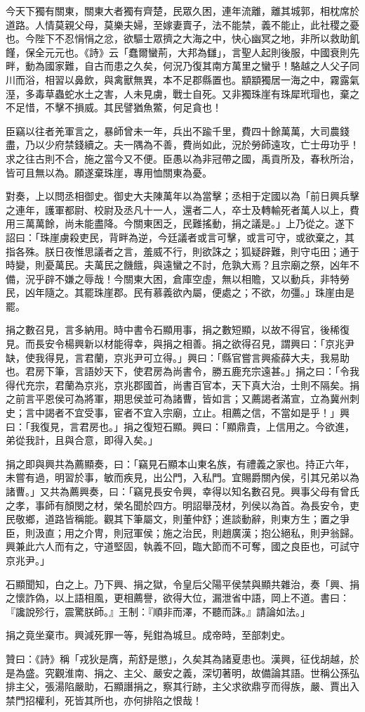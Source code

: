 \begin{pinyinscope}
今天下獨有關東，關東大者獨有齊楚，民眾久困，連年流離，離其城郭，相枕席於道路。人情莫親父母，莫樂夫婦，至嫁妻賣子，法不能禁，義不能止，此社稷之憂也。今陛下不忍悁悁之忿，欲驅士眾擠之大海之中，快心幽冥之地，非所以救助飢饉，保全元元也。《詩》云「蠢爾蠻荊，大邦為讎」，言聖人起則後服，中國衰則先畔，動為國家難，自古而患之久矣，何況乃復其南方萬里之蠻乎！駱越之人父子同川而浴，相習以鼻飲，與禽獸無異，本不足郡縣置也。顓顓獨居一海之中，霧露氣溼，多毒草蟲蛇水土之害，人未見虜，戰士自死。又非獨珠崖有珠犀玳瑁也，棄之不足惜，不擊不損威。其民譬猶魚鱉，何足貪也！

臣竊以往者羌軍言之，暴師曾未一年，兵出不踰千里，費四十餘萬萬，大司農錢盡，乃以少府禁錢續之。夫一隅為不善，費尚如此，況於勞師遠攻，亡士毋功乎！求之往古則不合，施之當今又不便。臣愚以為非冠帶之國，禹貢所及，春秋所治，皆可且無以為。願遂棄珠崖，專用恤關東為憂。

對奏，上以問丞相御史。御史大夫陳萬年以為當擊；丞相于定國以為「前日興兵擊之連年，護軍都尉、校尉及丞凡十一人，還者二人，卒士及轉輸死者萬人以上，費用三萬萬餘，尚未能盡降。今關東困乏，民難搖動，捐之議是。」上乃從之。遂下詔曰：「珠崖虜殺吏民，背畔為逆，今廷議者或言可擊，或言可守，或欲棄之，其指各殊。朕日夜惟思議者之言，羞威不行，則欲誅之；狐疑辟難，則守屯田；通于時變，則憂萬民。夫萬民之饑餓，與遠蠻之不討，危孰大焉？且宗廟之祭，凶年不備，況乎辟不嫌之辱哉！今關東大困，倉庫空虛，無以相贍，又以動兵，非特勞民，凶年隨之。其罷珠崖郡。民有慕義欲內屬，便處之；不欲，勿彊。」珠崖由是罷。

捐之數召見，言多納用。時中書令石顯用事，捐之數短顯，以故不得官，後稀復見。而長安令楊興新以材能得幸，與捐之相善。捐之欲得召見，謂興曰：「京兆尹缺，使我得見，言君蘭，京兆尹可立得。」興曰：「縣官嘗言興瘉薛大夫，我易助也。君房下筆，言語妙天下，使君房為尚書令，勝五鹿充宗遠甚。」捐之曰：「令我得代充宗，君蘭為京兆，京兆郡國首，尚書百官本，天下真大治，士則不隔矣。捐之前言平恩侯可為將軍，期思侯並可為諸曹，皆如言；又薦謁者滿宣，立為冀州刺史；言中謁者不宜受事，宦者不宜入宗廟，立止。相薦之信，不當如是乎！」興曰：「我復見，言君房也。」捐之復短石顯。興曰：「顯鼎貴，上信用之。今欲進，弟從我計，且與合意，即得入矣。」

捐之即與興共為薦顯奏，曰：「竊見石顯本山東名族，有禮義之家也。持正六年，未嘗有過，明習於事，敏而疾見，出公門，入私門。宜賜爵關內侯，引其兄弟以為諸曹。」又共為薦興奏，曰：「竊見長安令興，幸得以知名數召見。興事父母有曾氏之孝，事師有顏閔之材，榮名聞於四方。明詔舉茂材，列侯以為首。為長安令，吏民敬鄉，道路皆稱能。觀其下筆屬文，則董仲舒；進談動辭，則東方生；置之爭臣，則汲直；用之介冑，則冠軍侯；施之治民，則趙廣漢；抱公絕私，則尹翁歸。興兼此六人而有之，守道堅固，執義不回，臨大節而不可奪，國之良臣也，可試守京兆尹。」

石顯聞知，白之上。乃下興、捐之獄，令皇后父陽平侯禁與顯共雜治，奏「興、捐之懷詐偽，以上語相風，更相薦譽，欲得大位，漏泄省中語，岡上不道。書曰：『讒說殄行，震驚朕師。』王制：『順非而澤，不聽而誅。』請論如法。」

捐之竟坐棄市。興減死罪一等，髡鉗為城旦。成帝時，至部刺史。

贊曰：《詩》稱「戎狄是膺，荊舒是懲」，久矣其為諸夏患也。漢興，征伐胡越，於是為盛。究觀淮南、捐之、主父、嚴安之義，深切著明，故備論其語。世稱公孫弘排主父，張湯陷嚴助，石顯譖捐之，察其行跡，主父求欲鼎亨而得族，嚴、賈出入禁門招權利，死皆其所也，亦何排陷之恨哉！


\end{pinyinscope}